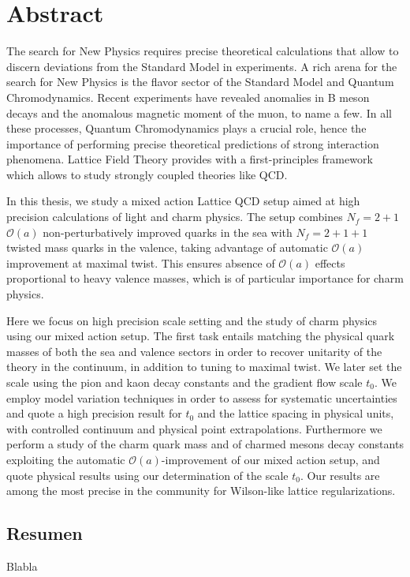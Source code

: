 \begingroup
\let\clearpage\relax
\let\cleardoublepage\relax
\let\cleardoublepage\relax

\chapter*{Abstract}
The search for New Physics requires precise theoretical calculations that allow to discern deviations from the Standard Model in experiments. A rich arena for the search for New Physics is the flavor sector of the Standard Model and Quantum Chromodynamics. Recent experiments have revealed anomalies in B meson decays and the anomalous magnetic moment of the muon, to name a few. In all these processes, Quantum Chromodynamics plays a crucial role, hence the importance of performing precise theoretical predictions of strong interaction phenomena. Lattice Field Theory provides with a first-principles framework which allows to study strongly coupled theories like QCD.

In this thesis, we study a mixed action Lattice QCD setup aimed at high precision calculations of light and charm physics. The setup combines $N_f=2+1$ $\mathcal{O}(a)$ non-perturbatively improved quarks in the sea with $N_f=2+1+1$ twisted mass quarks in the valence, taking advantage of automatic $\mathcal{O}(a)$ improvement at maximal twist. This ensures absence of $\mathcal{O}(a)$ effects proportional to heavy valence masses, which is of particular importance for charm physics. 

Here we focus on high precision scale setting and the study of charm physics using our mixed action setup. The first task entails matching the physical quark masses of both the sea and valence sectors in order to recover unitarity of the theory in the continuum, in addition to tuning to maximal twist. We later set the scale using the pion and kaon decay constants and the gradient flow scale $t_0$. We employ model variation techniques in order to assess for systematic uncertainties and quote a high precision result for $t_0$ and the lattice spacing in physical units, with controlled continuum and physical point extrapolations. Furthermore we perform a study of the charm quark mass and of charmed mesons decay constants exploiting the automatic $\mathcal{O}(a)$-improvement of our mixed action setup, and quote physical results using our determination of the scale $t_0$. Our results are among the most precise in the community for Wilson-like lattice regularizations.

\vfill

\begin{otherlanguage}{spanish}
\chapter*{Resumen}
Blabla
\end{otherlanguage}

\endgroup

\vfill
